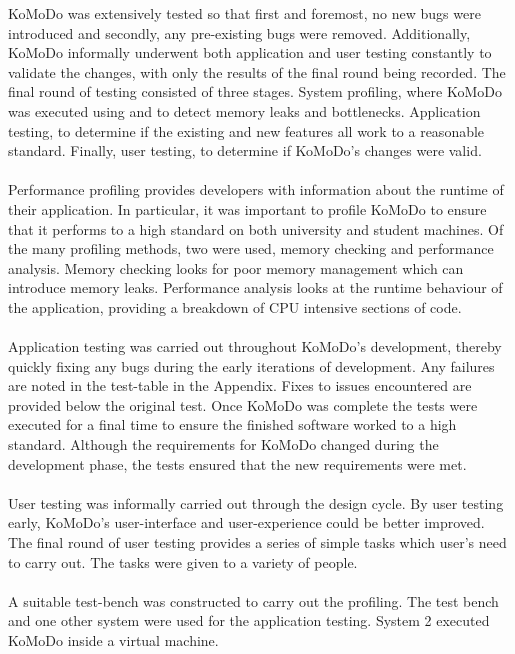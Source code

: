 KoMoDo was extensively tested so that first and foremost, no new bugs were introduced and secondly, any pre-existing bugs were removed. Additionally, KoMoDo informally underwent both application and user testing constantly to validate the changes, with only the results of the final round being recorded.
The final round of testing consisted of three stages. System profiling, where KoMoDo was executed using  and  to detect memory leaks and bottlenecks. Application testing, to determine if the existing and new features all work to a reasonable standard. Finally, user testing, to determine if KoMoDo's changes were valid.\\\\
%
Performance profiling provides developers with information about the runtime of their application. In particular, it was important to profile KoMoDo to ensure that it performs to a high standard on both university and student machines. Of the many profiling methods, two were used, memory checking and performance analysis. Memory checking looks for poor memory management which can introduce memory leaks. Performance analysis looks at the runtime behaviour of the application, providing a breakdown of CPU intensive sections of code.\\\\
%
Application testing was carried out throughout KoMoDo's development, thereby quickly fixing any bugs during the early iterations of development. Any failures are noted in the test-table in the Appendix. Fixes to issues encountered are provided below the original test. Once KoMoDo was complete the tests were executed for a final time to ensure the finished software worked to a high standard. Although the requirements for KoMoDo changed during the development phase, the tests ensured that the new requirements were met.\\\\
%
User testing was informally carried out through the design cycle. By user testing early, KoMoDo's user-interface and user-experience could be better improved. The final round of user testing provides a series of simple tasks which user's need to carry out. The tasks were given to a variety of people.\\\\
%
A suitable test-bench was constructed to carry out the profiling. The test bench and one other system were used for the application testing. System 2 executed KoMoDo inside a virtual machine.\\\\
